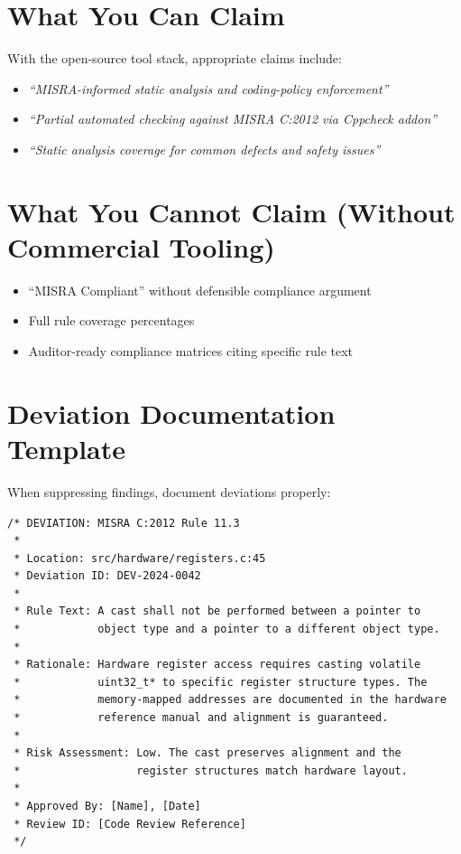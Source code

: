 \documentclass[11pt,letterpaper]{report}
\begin{document}
\section{What You Can Claim}

With the open-source tool stack, appropriate claims include:

\begin{itemize}[leftmargin=*]
    \item \textit{``MISRA-informed static analysis and coding-policy enforcement''}
    \item \textit{``Partial automated checking against MISRA C:2012 via Cppcheck addon''}
    \item \textit{``Static analysis coverage for common defects and safety issues''}
\end{itemize}

\section{What You Cannot Claim (Without Commercial Tooling)}

\begin{itemize}[leftmargin=*]
    \item ``MISRA Compliant'' without defensible compliance argument
    \item Full rule coverage percentages
    \item Auditor-ready compliance matrices citing specific rule text
\end{itemize}

\section{Deviation Documentation Template}

When suppressing findings, document deviations properly:

\begin{verbatim}
/* DEVIATION: MISRA C:2012 Rule 11.3
 *
 * Location: src/hardware/registers.c:45
 * Deviation ID: DEV-2024-0042
 *
 * Rule Text: A cast shall not be performed between a pointer to
 *            object type and a pointer to a different object type.
 *
 * Rationale: Hardware register access requires casting volatile
 *            uint32_t* to specific register structure types. The
 *            memory-mapped addresses are documented in the hardware
 *            reference manual and alignment is guaranteed.
 *
 * Risk Assessment: Low. The cast preserves alignment and the
 *                  register structures match hardware layout.
 *
 * Approved By: [Name], [Date]
 * Review ID: [Code Review Reference]
 */
\end{verbatim}
\end{document}
